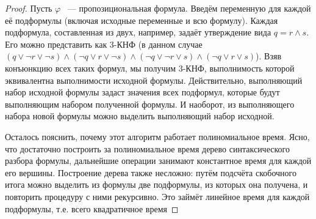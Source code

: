 \begin{proof}
Пусть $\varphi$ ~--- пропозициональная формула. Введём переменную для каждой её подформулы (включая исходные переменные и всю формулу). Каждая подформула, составленная из двух, например, задаёт утверждение вида $q = r \wedge s$. Его можно представить как 3-КНФ (в данном случае $(q \vee \neg r \vee \neg s) \wedge (\neg q \vee r \vee \neg s) \wedge (\neg q \vee \neg r \vee s) \wedge (\neg q \vee r \vee s)$). Взяв конъюнкцию всех таких формул, мы получим 3-КНФ, выполнимость которой эквивалентна выполнимости исходной формулы. Действительно, выполняющий набор исходной формулы задаст значения всех подформул, которые будут выполняющим набором полученной формулы. И наоборот, из выполняющего набора новой формулы можно выделить выполняющий набор исходной.

Осталось пояснить, почему этот алгоритм работает полиномиальное время. Ясно, что достаточно построить за полиномиальное время дерево синтаксического разбора формулы, дальнейшие операции занимают константное время для каждой его вершины. Построение дерева также несложно: путём подсчёта скобочного итога можно выделить из формулы две подформулы, из которых она получена, и повторить процедуру с ними рекурсивно. Это займёт линейное время для каждой подформулы, т.е. всего квадратичное время 
\end{proof}